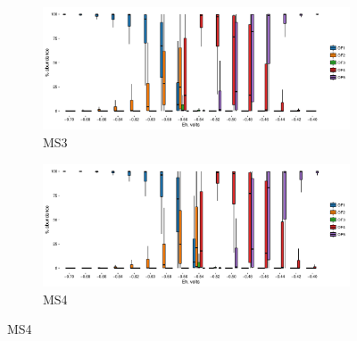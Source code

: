 \newpage

\begin{figure}[h]\ContinuedFloat
\centering

    \begin{subfigure}[b]{\linewidth}
       	\includegraphics[width=1\linewidth]{"figs_app2/boxplot_ggplot_02bin Mound OF3 iter 999"}
       	\caption{MS3}
        \label{fig:MS3_mc}
    \end{subfigure}
    \begin{subfigure}[b]{\linewidth}
    	\includegraphics[width=1\linewidth]{"figs_app2/boxplot_ggplot_02bin Mound OF4 iter 999"}
    	\caption{MS4}
        \label{fig:MS4_mc}
    \end{subfigure}
    
\end{figure}

\newpage

